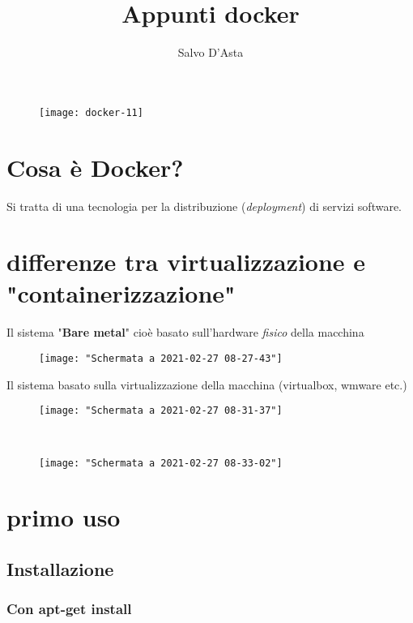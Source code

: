 \documentclass[12pt,a4paper]{report}
\author{Salvo D'Asta}
\title{Appunti docker}
\begin{document}
	\maketitle
\begin{figure}[h]
	\centering
	\texttt{[image: docker-11]}
	\caption[docker]{}
\end{figure}

\tableofcontents
\chapter{Cosa è Docker?}
Si tratta di una tecnologia per la distribuzione (\textit{deployment}) di servizi software.
\chapter{differenze tra virtualizzazione e "containerizzazione"}
Il sistema "\textbf{Bare metal}" cioè basato sull'hardware \textit{fisico} della macchina\\
\begin{figure}[h]
	\centering
	\texttt{[image: "Schermata a 2021-02-27 08-27-43"]}
	\caption{}
	\label{fig:schermata-a-2021-02-27-08-27-43}
\end{figure}
Il sistema basato sulla virtualizzazione della macchina (virtualbox, wmware etc.)
\begin{figure}[p]
	\centering
	\texttt{[image: "Schermata a 2021-02-27 08-31-37"]}
	\caption{}
	\label{fig:schermata-a-2021-02-27-08-31-37}
\end{figure}\\
\begin{figure}[!]
	\centering
	\texttt{[image: "Schermata a 2021-02-27 08-33-02"]}
	\caption{}
	\label{fig:schermata-a-2021-02-27-08-33-02}
\end{figure}





  
\chapter{primo uso}	

	\section{Installazione}
	\subsection{Con apt-get install}
	
\end{document}
